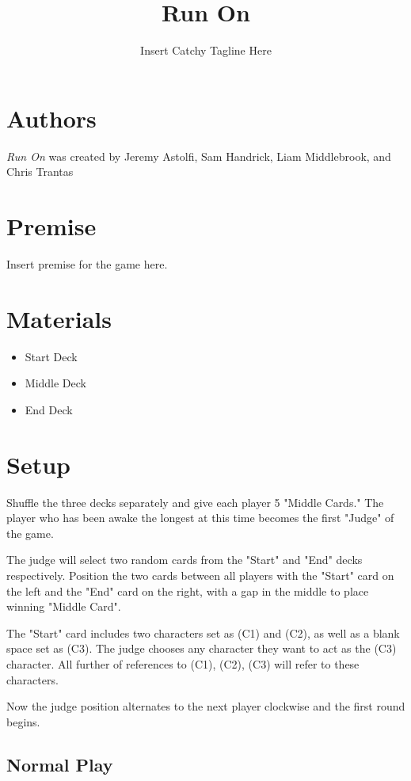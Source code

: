 \documentclass[twocolumn]{article}
\title{Run On}
\author{Insert Catchy Tagline Here}
\date{}
\begin{document}
\maketitle

\section*{Authors}

\emph{Run On} was created by Jeremy Astolfi, Sam Handrick, Liam Middlebrook, and Chris Trantas

\section*{Premise}

Insert premise for the game here.

\section*{Materials}

\begin{itemize}
	\item Start Deck
	\item Middle Deck
	\item End Deck
\end{itemize}

\section*{Setup}

Shuffle the three decks separately and give each player 5 "Middle Cards." The player who has been awake the longest at this time becomes the first "Judge" of the game.

The judge will select two random cards from the "Start" and "End" decks respectively. Position the two cards between all players with the "Start" card on the left and the "End" card on the right, with a gap in the middle to place winning "Middle Card".

The "Start" card includes two characters set as (C1) and (C2), as well as a blank space set as (C3). The judge chooses any character they want to act as the (C3) character. All further of references to (C1), (C2), (C3) will refer to these characters.

Now the judge position alternates to the next player clockwise and the first round begins.

\subsection*{Normal Play}
\end{document}
